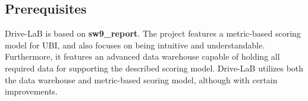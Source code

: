 \subsection{Prerequisites}\label{subsec:prereq}
Drive-LaB is based on \textbf{sw9_report}. The project features a metric-based scoring model for UBI, and also focuses on being intuitive and understandable. Furthermore, it features an advanced data warehouse capable of holding all required data for supporting the described scoring model. Drive-LaB utilizes both the data warehouse and metric-based scoring model, although with certain improvements. 